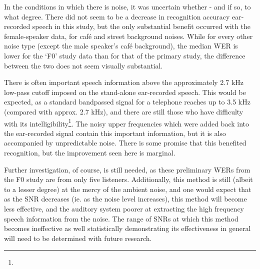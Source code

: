In the conditions in which there is noise, it was uncertain whether \DIFdelbegin {}\DIFdelend \DIFaddbegin {}\DIFaddend - and if so, to what degree\DIFdelbegin {}\DIFdelend .  There did not seem to be a decrease in recognition accuracy \DIFdelbegin {}\DIFdelend \DIFaddbegin {}\DIFaddend ear-recorded speech in this study, but the only substantial benefit occurred with the female-speaker data, for caf\'{e} and street background noises.  While for every other noise type (except the male speaker's caf\'{e} background), the median WER is lower for the `F0' study data than for that of the primary study, the difference between the two does not seem visually substantial.

There is often important \DIFdelbegin {}\DIFdelend speech information above the approximately 2.7 kHz low-pass cutoff imposed on the stand-alone ear-recorded speech.  This would be expected, as a standard bandpassed signal for a telephone reaches up to 3.5 kHz (compared with approx. 2.7 kHz), and there are still those who have difficulty with its intelligibility\DIFaddbegin \footnote{}\DIFaddend .  The noisy upper frequencies which were added back into the ear-recorded signal contain this important information, but it is also accompanied by unpredictable noise.  There is some promise that this benefited recognition, but the improvement seen here is \DIFdelbegin {}\DIFdelend marginal.

Further investigation, of course, is still needed, as these preliminary WERs from the F0 study are from only five listeners.  Additionally, this method is still (albeit to a lesser degree) at the mercy of the ambient noise, and one would expect that as the SNR decreases (ie. as the noise level increases), this method will become less effective, and the auditory system poorer at extracting the high frequency speech information from the noise.  The range of SNRs at which this method becomes ineffective \DIFdelbegin \DIFdel{, }\DIFdelend \DIFaddbegin \DIFadd{- }\DIFaddend as well statistically demonstrating its effectiveness in general \DIFdelbegin \DIFdel{, }\DIFdelend \DIFaddbegin \DIFadd{- }\DIFaddend will need to be determined with future research.

